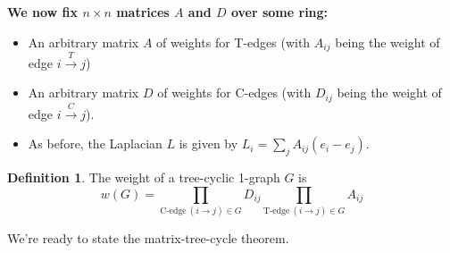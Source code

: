 \documentclass[a4paper, 11pt]{article}
\theoremstyle{definition}
\newtheorem{definition}{Definition}[section]
\begin{document}
\textbf{We now fix $n\times n$ matrices $A$ and $D$ over some ring:}

\begin{itemize}
  \item An arbitrary matrix $A$ of weights for T-edges (with $A_{ij}$ being the weight of edge $i \xrightarrow{T} j$)
  \item An arbitrary matrix $D$ of weights for C-edges (with $D_{ij}$ being the weight of edge $i \xrightarrow{C} j$).
  \item As before, the Laplacian $L$ is given by $L_i = \sum_j A_{ij}(e_i - e_j)$.
\end{itemize}


\begin{definition}
  The weight of a tree-cyclic 1-graph $G$ is
  \[
    w(G) = \prod_{\text{C-edge}\ (i \to j) \in G} D_{ij} \prod_{\text{T-edge}\ (i \to j) \in G} A_{ij}
  \]
\end{definition}

We’re ready to state the matrix-tree-cycle theorem.
\end{document}
